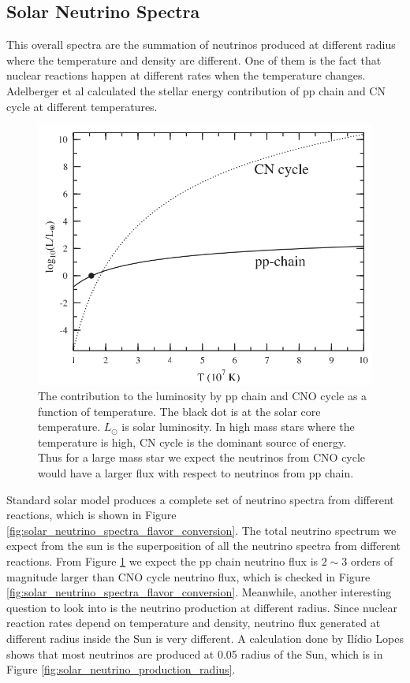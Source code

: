 \subsection{Solar Neutrino Spectra}


This overall spectra are the summation of neutrinos produced at different radius where the temperature and density are different. One of them is the fact that nuclear reactions happen at different rates when the temperature changes. Adelberger et al calculated the stellar energy contribution of pp chain and CN cycle at different temperatures.\cite{Adelberger2011a}

\begin{figure}[!hbtp]
\centering
\includegraphics[width=\columnwidth]{chapters/assets/solar/pp_chain_vs_cno.png}
\caption{The contribution to the luminosity by pp chain and CNO cycle as a function of temperature.\cite{Adelberger2011a} The black dot is at the solar core temperature. $L_{\odot}$ is solar luminosity. In high mass stars where the temperature is high, CN cycle is the dominant source of energy. Thus for a large mass star we expect the neutrinos from CNO cycle would have a larger flux with respect to neutrinos from pp chain.
}
\label{fig:pp_chain_vs_cno}
\end{figure}

Standard solar model produces a complete set of neutrino spectra from different reactions, which is shown in Figure \ref{fig:solar_neutrino_spectra_flavor_conversion}. The total neutrino spectrum we expect from the sun is the superposition of all the neutrino spectra from different reactions. From Figure \ref{fig:pp_chain_vs_cno} we expect the pp chain neutrino flux is $2\sim 3$ orders of magnitude larger than CNO cycle neutrino flux, which is checked in Figure \ref{fig:solar_neutrino_spectra_flavor_conversion}. Meanwhile, another interesting question to look into is the neutrino production at different radius. Since nuclear reaction rates depend on temperature and density, neutrino flux generated at different radius inside the Sun is very different. A calculation done by Ilídio Lopes shows that most neutrinos are produced at 0.05 radius of the Sun, which is in Figure \ref{fig:solar_neutrino_production_radius}.\cite{Lopes2013}





